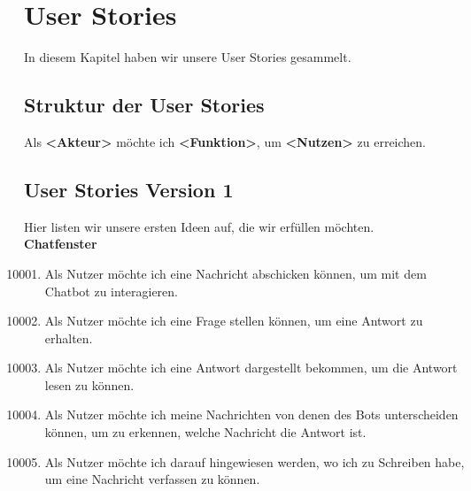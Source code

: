 \section{User Stories}
In diesem Kapitel haben wir unsere User Stories gesammelt.

\subsection{Struktur der User Stories}
Als \textbf{<Akteur>} möchte ich \textbf{<Funktion>}, um \textbf{<Nutzen>} zu erreichen.
\subsection{User Stories Version 1}
Hier listen wir unsere ersten Ideen auf, die wir erfüllen möchten.
\\

\textbf{Chatfenster}
\begin{enumerate}[leftmargin=*,labelindent=40pt,label=u\arabic*.]
    \setcounter{enumi}{10000}
    \item Als Nutzer möchte ich eine Nachricht abschicken können, um mit dem Chatbot zu interagieren.
    \item Als Nutzer möchte ich eine Frage stellen können, um eine Antwort zu erhalten.
    \item Als Nutzer möchte ich eine Antwort dargestellt bekommen, um die Antwort lesen zu können.
    \item Als Nutzer möchte ich meine Nachrichten von denen des Bots unterscheiden können, um zu erkennen, welche Nachricht die Antwort ist.
    \item Als Nutzer möchte ich darauf hingewiesen werden, wo ich zu Schreiben habe, um eine Nachricht verfassen zu können.
\end{enumerate}


